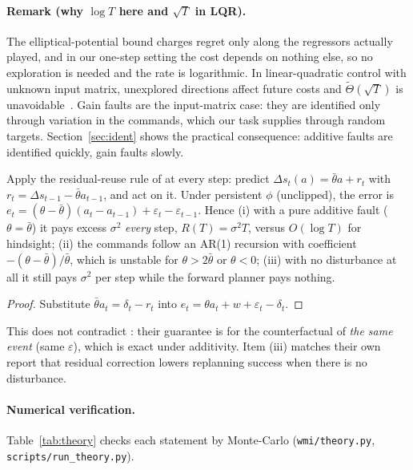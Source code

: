 \paragraph{Remark (why $\log T$ here and $\sqrt T$ in LQR).} The elliptical-potential bound charges regret only along
the regressors actually played, and in our one-step setting the cost depends on nothing else, so no exploration is
needed and the rate is logarithmic. In linear-quadratic control with unknown input matrix, unexplored directions
affect future costs and $\tilde\Theta(\sqrt T)$ is unavoidable~\citep{simchowitz2020,cassel2020}. Gain faults are
the input-matrix case: they are identified only through variation in the commands, which our task supplies through
random targets. Section~\ref{sec:ident} shows the practical consequence: additive faults are identified quickly,
gain faults slowly.

\begin{theorem}\label{thm:residual}
Apply the residual-reuse rule of \citet{cwm_2611_24778} at every step: predict
$\Delta s_t(a)=\bar\theta a+r_{t}$ with $r_t=\Delta s_{t-1}-\bar\theta a_{t-1}$, and act on it. Under persistent $\phi$
(unclipped), the error is $e_t=(\theta-\bar\theta)(a_t-a_{t-1})+\varepsilon_t-\varepsilon_{t-1}$. Hence
(i) with a pure additive fault ($\theta=\bar\theta$) it pays excess $\sigma^2$ \emph{every} step, $R(T)=\sigma^2T$,
versus $O(\log T)$ for hindsight; (ii) the commands follow an AR(1) recursion with coefficient
$-(\theta-\bar\theta)/\bar\theta$, which is unstable for $\theta>2\bar\theta$ or $\theta<0$;
(iii) with no disturbance at all it still pays $\sigma^2$ per step while the forward planner pays nothing.
\end{theorem}
\begin{proof}
Substitute $\bar\theta a_t=\delta_t-r_t$ into $e_t=\theta a_t+w+\varepsilon_t-\delta_t$.
\end{proof}
This does not contradict \citet{cwm_2611_24778}: their guarantee is for the counterfactual of \emph{the same event}
(same $\varepsilon$), which is exact under additivity. Item (iii) matches their own report that residual correction
lowers replanning success when there is no disturbance.

\paragraph{Numerical verification.} Table~\ref{tab:theory} checks each statement by Monte-Carlo
(\texttt{wmi/theory.py}, \texttt{scripts/run\_theory.py}).
\begin{table}[h]\centering\scriptsize
{}
\caption{Cumulative regret $R(T)$ and $t\cdot\text{excess}_t$ late in the run (constant $\Rightarrow$ $1/t$ decay;
Theorem~\ref{thm:separation} predicts $\sigma^2d$). Mean $\pm$ s.d.\ over seeds.}
\label{tab:theory}
\end{table}

